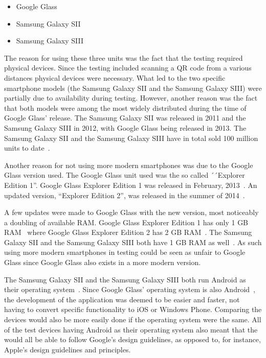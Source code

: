\begin{itemize}
	\item Google Glass
	\item Samsung Galaxy SII
	\item Samsung Galaxy SIII
\end{itemize}

The reason for using these three units was the fact that the testing required physical devices. Since the testing included scanning a QR code from a various distances physical devices were necessary. What led to the two specific smartphone models (the Samsung Galaxy SII and the Samsung Galaxy SIII) were partially due to availability during testing. However, another reason was the fact that both models were among the most widely distributed during the time of Google Glass' release. The Samsung Galaxy SII was released in 2011 and the Samsung Galaxy SIII in 2012, with Google Glass being released in 2013. The Samsung Galaxy SII and the Samsung Galaxy SIII have in total sold 100 million units to date~\cite{samsungGalaxyS2Sales, samsungGalaxyS3Sales}.

Another reason for not using more modern smartphones was due to the Google Glass version used. The Google Glass unit used was the so called ´´Explorer Edition 1''. Google Glass Explorer Edition 1 was released in February, 2013~\cite{historyOfGlass}. An updated version, ``Explorer Edition 2'', was released in the summer of 2014~\cite{googleGlassEdition2RAM}. 

A few updates were made to Google Glass with the new version, most noticeably a doubling of available RAM. Google Glass Explorer Edition 1 has only 1 GB RAM~\cite{googleGlassEdition1RAM} where Google Glass Explorer Edition 2 has 2 GB RAM~\cite{googleGlassEdition2RAM}. The Samsung Galaxy SII and the Samsung Galaxy SIII both have 1 GB RAM as well~\cite{samsungGalaxyS2Wiki, samsungGalaxyS3Wiki}. As such using more modern smartphones in testing could be seen as unfair to Google Glass since Google Glass also exists in a more modern version.

The Samsung Galaxy SII and the Samsung Galaxy SIII both run Android as their operating system~\cite{samsungGalaxyS2Wiki, samsungGalaxyS3Wiki}. Since Google Glass' operating system is also Android~\cite{googleGlassWiki}, the development of the application was deemed to be easier and faster, not having to convert specific functionality to iOS or Windows Phone. Comparing the devices would also be more easily done if the operating system were the same. All of the test devices having Android as their operating system also meant that the would all be able to follow Google's design guidelines, as opposed to, for instance, Apple's design guidelines and principles\cite{iosDesignGuidelines}.

